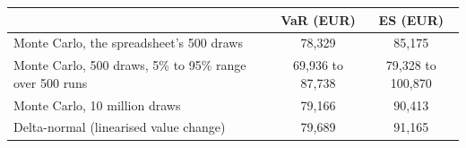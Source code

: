 \begin{tabular}{lcc}
\toprule
 & VaR (EUR) & ES (EUR) \\
\midrule
Monte Carlo, the spreadsheet's 500 draws & 78{,}329 & 85{,}175 \\
Monte Carlo, 500 draws, 5\% to 95\% range over 500 runs & 69{,}936 to 87{,}738 & 79{,}328 to 100{,}870 \\
Monte Carlo, 10 million draws & 79{,}166 & 90{,}413 \\
Delta-normal (linearised value change) & 79{,}689 & 91{,}165 \\
\bottomrule
\end{tabular}
